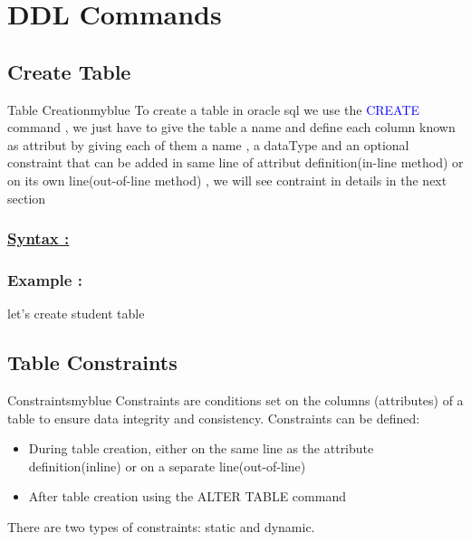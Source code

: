 \newpage
\section{DDL Commands}
\subsection{Create Table}
\begin{prettyBox}{Table Creation}{myblue}
    To create a table in oracle sql we use the \textcolor{blue}{CREATE} command , we just have to give the table a name and define each column known as attribut
by giving each of them a name , a dataType and an optional constraint that can be added in same line of
attribut definition(in-line method) or on its own line(out-of-line method) , we will see contraint in details in the next section
\end{prettyBox}

\vspace{0.5cm}
\subsubsection*{\underline{Syntax :}}




\vspace{0.5cm}
\subsubsection*{Example :} let's create student table 



\vspace{0.5cm}
\subsection{Table Constraints}

\begin{prettyBox}{Constraints}{myblue}
Constraints are conditions set on the columns (attributes) of a table to ensure data integrity and consistency. Constraints can be defined:
\begin{itemize}
    \item During table creation, either on the same line as the attribute definition(inline) or on a separate line(out-of-line)
    \item After table creation using the ALTER TABLE command
\end{itemize}

There are two types of constraints: static and dynamic.
\end{prettyBox}


